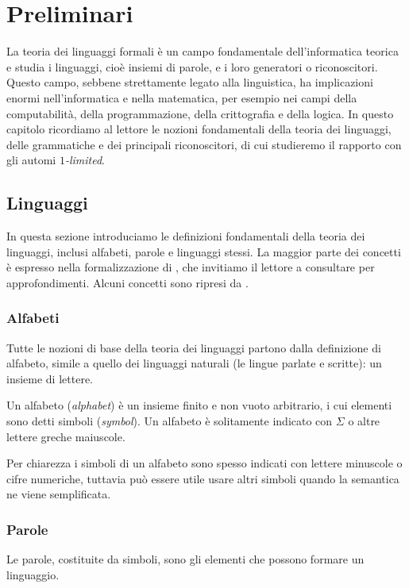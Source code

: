 \chapter{Preliminari}
La teoria dei linguaggi formali è un campo fondamentale dell'informatica teorica e studia i linguaggi, cioè insiemi di parole, e i loro generatori o riconoscitori. Questo campo, sebbene strettamente legato alla linguistica, ha implicazioni enormi nell'informatica e nella matematica, per esempio nei campi della computabilità, della programmazione, della crittografia e della logica. In questo capitolo ricordiamo al lettore le nozioni fondamentali della teoria dei linguaggi, delle grammatiche e dei principali riconoscitori, di cui studieremo il rapporto con gli automi \emph{$1$-limited}.



\section{Linguaggi}
In questa sezione introduciamo le definizioni fondamentali della teoria dei linguaggi, inclusi alfabeti, parole e linguaggi stessi. La maggior parte dei concetti è espresso nella formalizzazione di \cite{Hopcroft:01:introLFA2}, che invitiamo il lettore a consultare per approfondimenti. Alcuni concetti sono ripresi da \cite{Bertoni:04:dispLFA}.


\subsection*{Alfabeti}
Tutte le nozioni di base della teoria dei linguaggi partono dalla definizione di alfabeto, simile a quello dei linguaggi naturali (le lingue parlate e scritte): un insieme di lettere.
\begin{defin}[alfabeto]
	Un alfabeto (\emph{alphabet}) è un insieme finito e non vuoto arbitrario, i cui elementi sono detti simboli (\emph{symbol}). Un alfabeto è solitamente indicato con $\Sigma$ o altre lettere greche maiuscole.
\end{defin}
Per chiarezza i simboli di un alfabeto sono spesso indicati con lettere minuscole o cifre numeriche, tuttavia può essere utile usare altri simboli quando la semantica ne viene semplificata.


\subsection*{Parole}
Le parole, costituite da simboli, sono gli elementi che possono formare un linguaggio.

